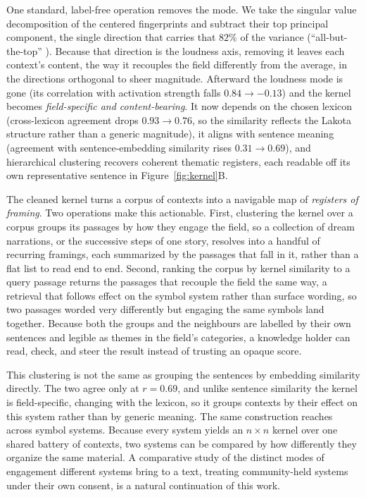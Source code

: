 \documentclass[final,creativeai]{article}
\begin{document}
One standard, label-free operation removes the mode. We take the singular value decomposition of the centered fingerprints and subtract their top principal component, the single direction that carries that $82\%$ of the variance (``all-but-the-top'' \citep{mu_allbutthetop_2018}). Because that direction is the loudness axis, removing it leaves each context's content, the way it recouples the field differently from the average, in the directions orthogonal to sheer magnitude. Afterward the loudness mode is gone (its correlation with activation strength falls $0.84 \to -0.13$) and the kernel becomes \emph{field-specific and content-bearing}. It now depends on the chosen lexicon (cross-lexicon agreement drops $0.93 \to 0.76$, so the similarity reflects the Lakota structure rather than a generic magnitude), it aligns with sentence meaning (agreement with sentence-embedding similarity rises $0.31 \to 0.69$), and hierarchical clustering recovers coherent thematic registers, each readable off its own representative sentence in Figure~\ref{fig:kernel}B.

The cleaned kernel turns a corpus of contexts into a navigable map of \emph{registers of framing}. Two operations make this actionable. First, clustering the kernel over a corpus groups its passages by how they engage the field, so a collection of dream narrations, or the successive steps of one story, resolves into a handful of recurring framings, each summarized by the passages that fall in it, rather than a flat list to read end to end. Second, ranking the corpus by kernel similarity to a query passage returns the passages that recouple the field the same way, a retrieval that follows effect on the symbol system rather than surface wording, so two passages worded very differently but engaging the same symbols land together. Because both the groups and the neighbours are labelled by their own sentences and legible as themes in the field's categories, a knowledge holder can read, check, and steer the result instead of trusting an opaque score.

This clustering is not the same as grouping the sentences by embedding similarity directly. The two agree only at $r=0.69$, and unlike sentence similarity the kernel is field-specific, changing with the lexicon, so it groups contexts by their effect on this system rather than by generic meaning. The same construction reaches across symbol systems. Because every system yields an $n \times n$ kernel over one shared battery of contexts, two systems can be compared by how differently they organize the same material. A comparative study of the distinct modes of engagement different systems bring to a text, treating community-held systems under their own consent, is a natural continuation of this work.
\end{document}
